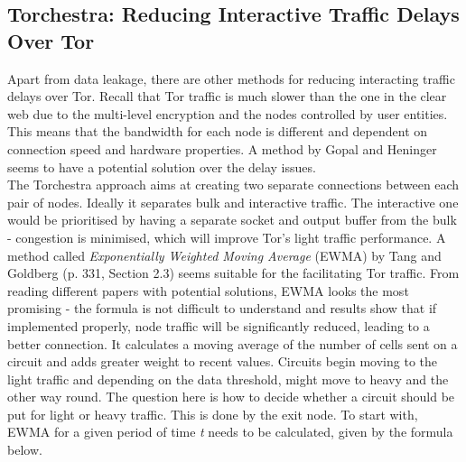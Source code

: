 \documentclass[a4paper, 12pt, titlepage]{article}
\begin{document}
\subsection{Torchestra: Reducing Interactive Traffic Delays Over Tor}
Apart from data leakage, there are other methods for reducing interacting traffic delays over Tor. Recall that Tor traffic is much slower than the one in the clear web due to the multi-level encryption and the nodes controlled by user entities. This means that the bandwidth for each node is different and dependent on connection speed and hardware properties. A method by Gopal and Heninger \cite{TorTrafficReduce} seems to have a potential solution over the delay issues. \\[6pt]
The Torchestra approach aims at creating two separate connections between each pair of nodes. Ideally it separates bulk and interactive traffic. The interactive one would be prioritised by having a separate socket and output buffer from the bulk - congestion is minimised, which will improve Tor's light traffic performance. A method called \textit{Exponentially Weighted Moving Average} (EWMA) by Tang and Goldberg (p. 331, Section 2.3) \cite{TorCSAlgorithm} seems suitable for the facilitating Tor traffic. From reading different papers with potential solutions, EWMA looks the most promising - the formula is not difficult to understand and results show that if implemented properly, node traffic will be significantly reduced, leading to a better connection. It calculates a moving average of the number of cells sent on a circuit and adds greater weight to recent values. Circuits begin moving to the light traffic and depending on the data threshold, might move to heavy and the other way round. The question here is how to decide whether a circuit should be put for light or heavy traffic. This is done by the exit node. To start with, EWMA for a given period of time \textit{t} needs to be calculated, given by the formula below.
\end{document}
